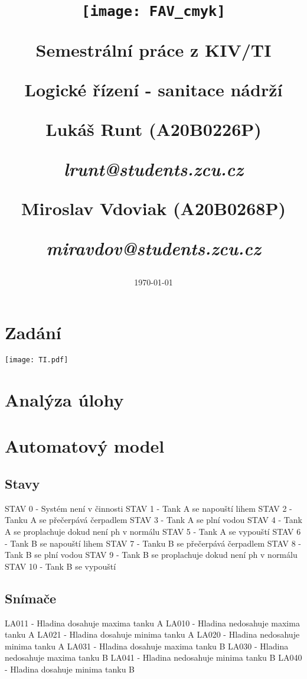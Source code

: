 \documentclass[12pt, a4paper]{article}
\title{\texttt{[image: FAV\_cmyk]}

{\huge Semestrální práce z KIV/TI}

\vspace{0.5cm}
{\LARGE Logické řízení - sanitace nádrží}
\vspace{1cm} 

\Large Lukáš Runt (A20B0226P)

\large {\itshape lrunt@students.zcu.cz}

\vspace{0.1cm}
\Large Miroslav Vdoviak (A20B0268P)

\large \itshape{miravdov@students.zcu.cz}
}
\date{\vspace{6cm} \today}
\begin{document}
\begin{titlepage}
\clearpage\maketitle
\thispagestyle{empty}
\end{titlepage}
\tableofcontents \newpage

\section{Zadání}
\texttt{[image: TI.pdf]}

\section{Analýza úlohy}

\section{Automatový model}

\subsection{Stavy}
STAV 0 - Systém není v činnosti \newline 
STAV 1 - Tank A se napouští lihem \newline 
STAV 2 - Tanku A se přečerpává čerpadlem \newline 
STAV 3 - Tank A se plní vodou \newline 
STAV 4 - Tank A se proplachuje dokud není ph v normálu \newline 
STAV 5 - Tank A se vypouští \newline 
STAV 6 - Tank B se napouští lihem \newline 
STAV 7 - Tanku B se přečerpává čerpadlem \newline 
STAV 8 - Tank B se plní vodou \newline 
STAV 9 - Tank B se proplachuje dokud není ph v normálu \newline 
STAV 10 - Tank B se vypouští 

\subsection{Snímače}
LA011 - Hladina dosahuje maxima tanku A \newline 
LA010 - Hladina nedosahuje maxima tanku A \newline 
LA021 - Hladina dosahuje minima tanku A \newline 
LA020 - Hladina nedosahuje minima tanku A \newline 
LA031 - Hladina dosahuje maxima tanku B \newline
LA030 - Hladina nedosahuje maxima tanku B \newline 
LA041 - Hladina nedosahuje minima tanku B \newline 
LA040 - Hladina dosahuje minima tanku B
\end{document}
